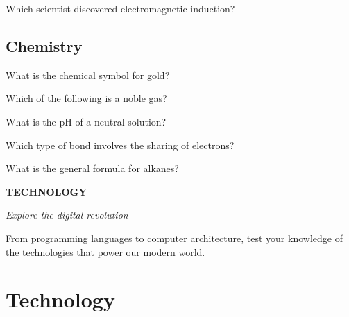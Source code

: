\documentclass[12pt,a4paper]{book}
\renewcommand{\sectioncover}[3]{%
  \cleardoublepage
  \thispagestyle{empty}
  \begin{center}
    \vspace*{2cm}
    {\huge\bfseries\textcolor{questblue}{#1}\par}
    \vspace{0.7cm}
    {\Large\textit{#2}\par}
    \vspace{1.2cm}
    \begin{tcolorbox}[
      enhanced,
      colback=white,
      colframe=questorange,
      arc=5mm,
      boxrule=0.5mm,
      width=0.7\textwidth,
      halign=center,
      valign=center,
      height=5cm
    ]
      \begin{center}
        {\large #3\par}
      \end{center}
    \end{tcolorbox}
    \vspace{1.5cm}
  \end{center}
  \cleardoublepage
}
\begin{document}
\begin{enhancedmcq}[Electromagnetism]{Which scientist discovered electromagnetic induction?}
\end{enhancedmcq}

\section{Chemistry}

\begin{enhancedmcq}{What is the chemical symbol for gold?}
\end{enhancedmcq}

\begin{enhancedmcq}{Which of the following is a noble gas?}
\end{enhancedmcq}

\begin{enhancedmcq}{What is the pH of a neutral solution?}
\end{enhancedmcq}

\begin{enhancedmcq}{Which type of bond involves the sharing of electrons?}
\end{enhancedmcq}

\begin{enhancedmcq}{What is the general formula for alkanes?}
\end{enhancedmcq}

\sectioncover{TECHNOLOGY}{Explore the digital revolution}{From programming languages to computer architecture, test your knowledge of the technologies that power our modern world.}

\chapter{Technology}
\end{document}
